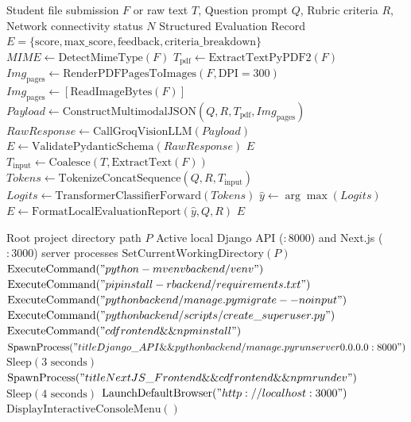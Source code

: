 \begin{algorithm}[H]
\caption{Dual-Engine Automated Assignment Grading and Fallback Pipeline}
\label{alg:ch3_dual_grader}
\begin{algorithmic}[1]
\REQUIRE Student file submission $F$ or raw text $T$, Question prompt $Q$, Rubric criteria $R$, Network connectivity status $N$
\ENSURE Structured Evaluation Record $E = \{\text{score}, \text{max\_score}, \text{feedback}, \text{criteria\_breakdown}\}$
    \STATE $MIME \leftarrow \text{DetectMimeType}(F)$
        \STATE $T_{\text{pdf}} \leftarrow \text{ExtractTextPyPDF2}(F)$
        \STATE $Img_{\text{pages}} \leftarrow \text{RenderPDFPagesToImages}(F, \text{DPI}=300)$
    \ELSE
        \STATE $Img_{\text{pages}} \leftarrow [\text{ReadImageBytes}(F)]$
    \ENDIF
    \STATE $Payload \leftarrow \text{ConstructMultimodalJSON}(Q, R, T_{\text{pdf}}, Img_{\text{pages}})$
    \STATE $RawResponse \leftarrow \text{CallGroqVisionLLM}(Payload)$
    \STATE $E \leftarrow \text{ValidatePydanticSchema}(RawResponse)$
    \RETURN $E$
\ELSE
    \STATE $T_{\text{input}} \leftarrow \text{Coalesce}(T, \text{ExtractText}(F))$
    \STATE $Tokens \leftarrow \text{TokenizeConcatSequence}(Q, R, T_{\text{input}})$
    \STATE $Logits \leftarrow \text{TransformerClassifierForward}(Tokens)$
    \STATE $\hat{y} \leftarrow \arg\max(Logits)$
    \STATE $E \leftarrow \text{FormatLocalEvaluationReport}(\hat{y}, Q, R)$
    \RETURN $E$
\ENDIF
\end{algorithmic}
\end{algorithm}

\begin{algorithm}[H]
\caption{NeuralSpark Offline Execution and Environment Orchestration Pipeline}
\label{alg:ch3_offline_launcher}
\begin{algorithmic}[1]
\REQUIRE Root project directory path $P$
\ENSURE Active local Django API ($:8000$) and Next.js ($:3000$) server processes
\STATE $\text{SetCurrentWorkingDirectory}(P)$
    \STATE $\text{ExecuteCommand}("python -m venv backend/venv")$
    \STATE $\text{ExecuteCommand}("pip install -r backend/requirements.txt")$
\ENDIF
\STATE $\text{ExecuteCommand}("python backend/manage.py migrate --noinput")$
\STATE $\text{ExecuteCommand}("python backend/scripts/create\_superuser.py")$
    \STATE $\text{ExecuteCommand}("cd frontend \&\& npm install")$
\ENDIF
\STATE $\text{SpawnProcess}("title Django\_API \&\& python backend/manage.py runserver 0.0.0.0:8000")$
\STATE $\text{Sleep}(3 \text{ seconds})$
\STATE $\text{SpawnProcess}("title NextJS\_Frontend \&\& cd frontend \&\& npm run dev")$
\STATE $\text{Sleep}(4 \text{ seconds})$
\STATE $\text{LaunchDefaultBrowser}("http://localhost:3000")$
\STATE $\text{DisplayInteractiveConsoleMenu}()$
\end{algorithmic}
\end{algorithm}

